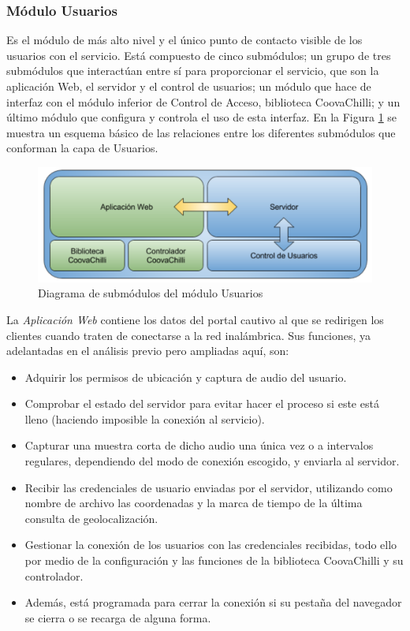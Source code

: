 \subsubsection{Módulo Usuarios}
Es el módulo de más alto nivel y el único punto de contacto visible de los usuarios con el servicio. Está compuesto de cinco submódulos; un grupo de tres submódulos que interactúan entre sí para proporcionar el servicio, que son la aplicación Web, el servidor y el control de usuarios; un módulo que hace de interfaz con el módulo inferior de Control de Acceso, biblioteca CoovaChilli; y un último módulo que configura y controla el uso de esta interfaz. En la Figura \ref{moduloUsers} se muestra un esquema básico de las relaciones entre los diferentes submódulos que conforman la capa de Usuarios.

\begin{figure}[!t]
\begin{center}
\includegraphics[width=0.75\linewidth]{./4_AnalisisFuncional/Img/moduloUsers.png}
\end{center}
\caption{Diagrama de submódulos del módulo Usuarios}
\label{moduloUsers}
\end{figure}

La \emph{Aplicación Web} contiene los datos del portal cautivo al que se redirigen los clientes cuando traten de conectarse a la red inalámbrica. Sus funciones, ya adelantadas en el análisis previo pero ampliadas aquí, son:

\begin{itemize}
\item Adquirir los permisos de ubicación y captura de audio del usuario.
\item Comprobar el estado del servidor para evitar hacer el proceso si este está lleno (haciendo imposible la conexión al servicio).
\item Capturar una muestra corta de dicho audio una única vez o a intervalos regulares, dependiendo del modo de conexión escogido, y enviarla al servidor.
\item Recibir las credenciales de usuario enviadas por el servidor, utilizando como nombre de archivo las coordenadas y la marca de tiempo de la última consulta de geolocalización.
\item Gestionar la conexión de los usuarios con las credenciales recibidas, todo ello por medio de la configuración y las funciones de la biblioteca CoovaChilli y su controlador.
\item Además, está programada para cerrar la conexión si su pestaña del navegador se cierra o se recarga de alguna forma.
\end{itemize}


